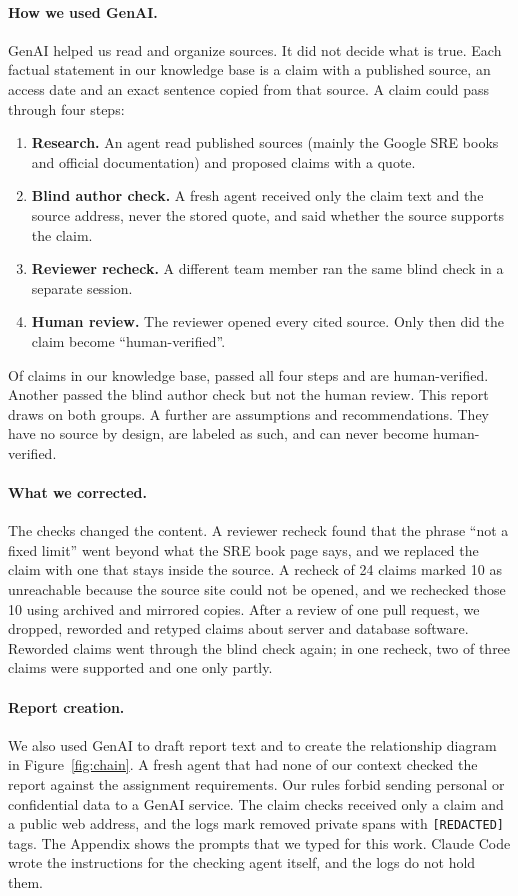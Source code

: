 \paragraph{How we used GenAI.}
GenAI helped us read and organize sources. It did not decide what is true. Each factual statement in our knowledge base is a claim with a published source, an access date and an exact sentence copied from that source. A claim could pass through four steps:
\begin{enumerate}
  \item \textbf{Research.} An agent read published sources (mainly the Google SRE books and official documentation) and proposed claims with a quote.
  \item \textbf{Blind author check.} A fresh agent received only the claim text and the source address, never the stored quote, and said whether the source supports the claim.
  \item \textbf{Reviewer recheck.} A different team member ran the same blind check in a separate session.
  \item \textbf{Human review.} The reviewer opened every cited source. Only then did the claim become ``human-verified''.
\end{enumerate}
Of \claimsTotal{} claims in our knowledge base, \claimsHumanVerified{} passed all four steps and are human-verified. Another \claimsAiChecked{} passed the blind author check but not the human review. This report draws on both groups. A further \claimsAssumption{} are assumptions and recommendations. They have no source by design, are labeled as such, and can never become human-verified.

\paragraph{What we corrected.}
The checks changed the content. A reviewer recheck found that the phrase ``not a fixed limit'' went beyond what the SRE book page says, and we replaced the claim with one that stays inside the source. A recheck of 24 claims marked 10 as unreachable because the source site could not be opened, and we rechecked those 10 using archived and mirrored copies. After a review of one pull request, we dropped, reworded and retyped claims about server and database software. Reworded claims went through the blind check again; in one recheck, two of three claims were supported and one only partly.

\paragraph{Report creation.}
We also used GenAI to draft report text and to create the relationship diagram in Figure~\ref{fig:chain}. A fresh agent that had none of our context checked the report against the assignment requirements. Our rules forbid sending personal or confidential data to a GenAI service. The claim checks received only a claim and a public web address, and the logs mark removed private spans with \texttt{[REDACTED]} tags. The Appendix shows the prompts that we typed for this work. Claude Code wrote the instructions for the checking agent itself, and the logs do not hold them.
